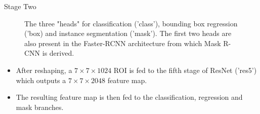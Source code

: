 \begin{frame} {Stage Two}
  \begin{figure}
    \centering
      \caption{\footnotesize{The three "heads" for classification ('class'), bounding box regression ('box) and instance segmentation ('mask'). The first two heads are also present in the Faster-RCNN architecture from which Mask R-CNN is derived.}
}
  \end{figure}
  \begin{itemize}
    \item After reshaping, a $7 \times 7 \times 1024$ ROI is fed to the fifth stage of ResNet ('res5') which outputs a $7 \times 7 \times 2048$ feature map.
    \item The resulting feature map is then fed to the classification, regression and mask branches.
  \end{itemize}
\end{frame}



